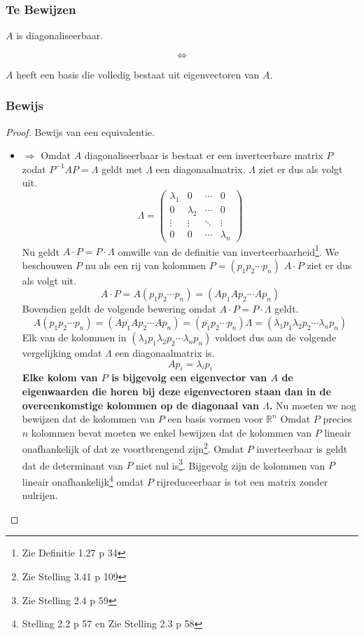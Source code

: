 \documentclass[lineaire_algebra_oplossingen.tex]{subfiles}
\begin{document}
\subsubsection*{Te Bewijzen}
\begin{center}
$A$ is diagonaliseerbaar.
\end{center}
\[\Leftrightarrow\]
\begin{center}
$A$ heeft een basis die volledig bestaat uit eigenvectoren van $A$.
\end{center}

\subsubsection*{Bewijs}
\begin{proof}
Bewijs van een equivalentie.
\begin{itemize}
\item $\Rightarrow$
Omdat $A$ diagonaliseerbaar is bestaat er een inverteerbare matrix $P$ zodat $P^{-1}AP = \Lambda$ geldt met $\Lambda$ een diagonaalmatrix. $\Lambda$ ziet er dus als volgt uit.
\[
\Lambda =
\begin{pmatrix}
\lambda_1 & 0 & \cdots & 0\\
0 & \lambda_2 & \cdots & 0\\
\vdots & \vdots & \ddots & \vdots\\
0 & 0 & \cdots & \lambda_n
\end{pmatrix}
\]
Nu geldt $A \cdot P = P \cdot \Lambda$ omwille van de definitie van inverteerbaarheid\footnote{Zie Definitie 1.27 p 34}.
We beschouwen $P$ nu als een rij van kolommen $P=(p_1 p_2 \cdots p_n)$
$A\cdot P$ ziet er dus als volgt uit.
\[
A\cdot P = A(p_1 p_2 \cdots p_n) = (Ap_1 Ap_2 \cdots Ap_n)
\]
Bovendien geldt de volgende bewering omdat $A \cdot P = P \cdot \Lambda$ geldt.
\[
A(p_1 p_2 \cdots p_n) = (Ap_1 Ap_2 \cdots Ap_n) = (p_1 p_2 \cdots p_n)\Lambda = (\lambda_1p_1 \lambda_2p_2 \cdots \lambda_np_n)
\]
Elk van de kolommen in $(\lambda_1p_1 \lambda_2p_2 \cdots \lambda_np_n)$ voldoet dus aan de volgende vergelijking omdat $\Lambda$ een diagonaalmatrix is.
\[
Ap_i = \lambda_ip_i
\]
\textbf{Elke kolom van $P$ is bijgevolg een eigenvector van $A$ de eigenwaarden die horen bij deze eigenvectoren staan dan in de overeenkomstige kolommen op de diagonaal van $\Lambda$.}
Nu moeten we nog bewijzen dat de kolommen van $P$ een basis vormen voor $\mathbb{R}^n$
Omdat $P$ precies $n$ kolommen bevat moeten we enkel bewijzen dat de kolommen van $P$ lineair onafhankelijk of dat ze voortbrengend zijn\footnote{Zie Stelling 3.41 p 109}.
Omdat $P$ inverteerbaar is geldt dat de determinant van $P$ niet nul is\footnote{Zie Stelling 2.4 p 59}.
Bijgevolg zijn de kolommen van $P$ lineair onafhankelijk\footnote{Stelling 2.2 p 57 en Zie Stelling 2.3 p 58} omdat $P$ rijreduceerbaar is tot een matrix zonder nulrijen.


\end{itemize}
\end{proof}
\end{document}
